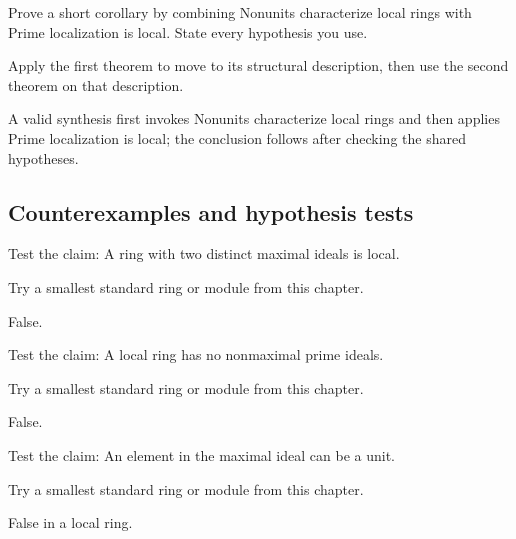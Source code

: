 \begin{exercise}\label{exr:v08-expand-09}
Prove a short corollary by combining Nonunits characterize local rings with Prime localization is local. State every hypothesis you use.
\end{exercise}
\begin{hint}
Apply the first theorem to move to its structural description, then use the second theorem on that description.
\end{hint}
\begin{solution}
A valid synthesis first invokes Nonunits characterize local rings and then applies Prime localization is local; the conclusion follows after checking the shared hypotheses.
\end{solution}

\subsection*{Counterexamples and hypothesis tests}

\begin{exercise}\label{exr:v08-expand-10}
Test the claim: A ring with two distinct maximal ideals is local.
\end{exercise}
\begin{hint}
Try a smallest standard ring or module from this chapter.
\end{hint}
\begin{solution}
False.
\end{solution}

\begin{exercise}\label{exr:v08-expand-11}
Test the claim: A local ring has no nonmaximal prime ideals.
\end{exercise}
\begin{hint}
Try a smallest standard ring or module from this chapter.
\end{hint}
\begin{solution}
False.
\end{solution}

\begin{exercise}\label{exr:v08-expand-12}
Test the claim: An element in the maximal ideal can be a unit.
\end{exercise}
\begin{hint}
Try a smallest standard ring or module from this chapter.
\end{hint}
\begin{solution}
False in a local ring.
\end{solution}

